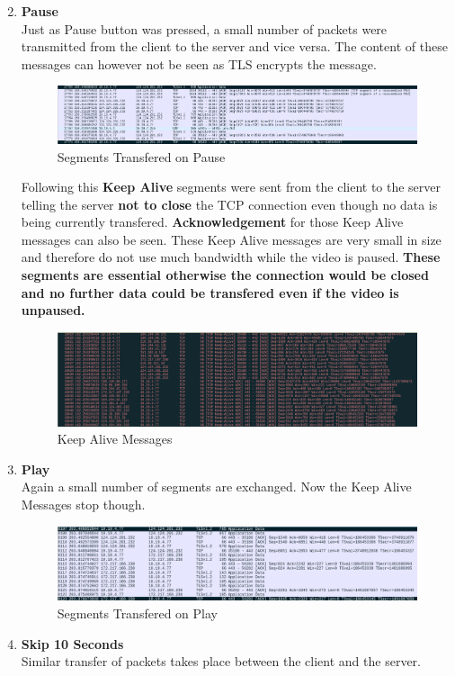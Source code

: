 \documentclass[a4paper,10pt]{article}
\newlength{\strutheight}
\begin{document}
\begin{enumerate}
\begin{adjustbox}{valign=T,raise=\strutheight,minipage={\linewidth}}
	\end{adjustbox} 
	\item \textbf{\color{Magenta} \large Pause}\\
	Just as Pause button was pressed, a small number of packets were transmitted from the client to the server and vice versa. The content of these messages can however not be seen as TLS encrypts the message.
	\begin{figure}[h]
		\includegraphics[width=\textwidth]{Images/pause1}
		\caption{Segments Transfered on Pause}
	\end{figure}

	\pagebreak
	Following this \textbf{Keep Alive} segments were sent from the client to the server telling the server \textbf{not to close} the TCP connection even though no data is being currently transfered. \textbf{Acknowledgement} for those Keep Alive messages can also be seen. These Keep Alive messages are very small in size and therefore do not use much bandwidth while the video is paused. \textbf{These segments are essential otherwise the connection would be closed and no further data could be transfered even if the video is unpaused.}
	\begin{figure}[h]
		\includegraphics[width=\textwidth]{Images/pause2}
		\caption{Keep Alive Messages}
	\end{figure}
	\item \textbf{\color{Magenta} \large Play}\\
	Again a small number of segments are exchanged. Now the Keep Alive Messages stop though.
	\begin{figure}[h]
		\includegraphics[width=\textwidth]{Images/play}
		\caption{ Segments Transfered on Play}
	\end{figure}
	\item \textbf{\color{Magenta} \large Skip 10 Seconds}\\
	Similar transfer of packets takes place between the client and the server.
\end{enumerate}
\end{document}
